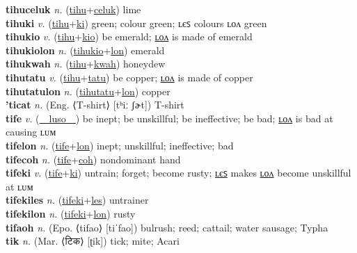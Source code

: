 \textbf{tihuceluk} \textit{n.} (\hyperref[tihu]{tihu}+\hyperref[celuk]{celuk})
lime \label{tihuceluk} \\
\textbf{tihuki} \textit{v.} (\hyperref[tihu]{tihu}+\hyperref[ki]{ki})
green; colour green; ʟєꜱ colours ʟᴏᴧ green \label{tihuki} \\
\textbf{tihukio} \textit{v.} (\hyperref[tihu]{tihu}+\hyperref[kio]{kio})
be emerald; \hyperref[tihukiolon]{ʟᴏᴧ} is made of emerald \label{tihukio} \\
\textbf{tihukiolon} \textit{n.} (\hyperref[tihukio]{tihukio}+\hyperref[lon]{lon})
emerald \label{tihukiolon} \\
\textbf{tihukwah} \textit{n.} (\hyperref[tihu]{tihu}+\hyperref[kwah]{kwah})
honeydew \label{tihukwah} \\
\textbf{tihutatu} \textit{v.} (\hyperref[tihu]{tihu}+\hyperref[tatu]{tatu})
be copper; \hyperref[tihutatulon]{ʟᴏᴧ} is made of copper \label{tihutatu} \\
\textbf{tihutatulon} \textit{n.} (\hyperref[tihutatu]{tihutatu}+\hyperref[lon]{lon})
copper \label{tihutatulon} \\
\textbf{'ticat} \textit{n.} (Eng. ⟨T-shirt⟩ [tʰiː ʃɚt])
T-shirt \label{'ticat} \\
\textbf{tife} \textit{v.} (\hyperref[luso]{~~luso~~})
be inept; be unskillful; be ineffective; be bad; \hyperref[tifelon]{ʟᴏᴧ} is bad at causing ʟᴜᴍ \label{tife} \\
\textbf{tifelon} \textit{n.} (\hyperref[tife]{tife}+\hyperref[lon]{lon})
inept; unskillful; ineffective; bad \label{tifelon} \\
\textbf{tifecoh} \textit{n.} (\hyperref[tife]{tife}+\hyperref[coh]{coh})
nondominant hand \label{tifecoh} \\
\textbf{tifeki} \textit{v.} (\hyperref[tife]{tife}+\hyperref[ki]{ki})
untrain; forget; become rusty; \hyperref[tifekiles]{ʟєꜱ} makes \hyperref[tifekilon]{ʟᴏᴧ} become unskillful at ʟᴜᴍ \label{tifeki} \\
\textbf{tifekiles} \textit{n.} (\hyperref[tifeki]{tifeki}+\hyperref[les]{les})
untrainer \label{tifekiles} \\
\textbf{tifekilon} \textit{n.} (\hyperref[tifeki]{tifeki}+\hyperref[lon]{lon})
rusty \label{tifekilon} \\
\textbf{tifaoh} \textit{n.} (Epo. ⟨tifao⟩ [tiˈfao])
bulrush; reed; cattail; water sausage; Typha \label{tifaoh} \\
\textbf{tik} \textit{n.} (Mar. ⟨टिक⟩ [ʈik])
tick; mite; Acari \label{tik} \\
